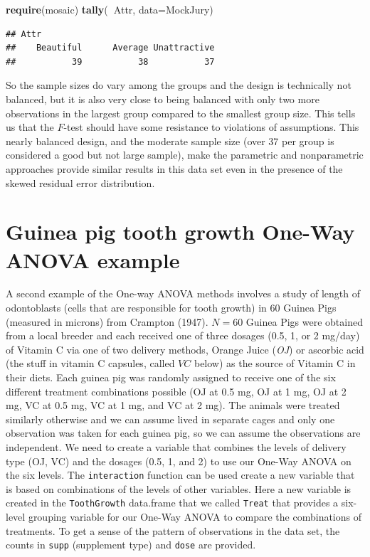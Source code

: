 \documentclass[]{book}
\newenvironment{Shaded}{\begin{snugshade}}{\end{snugshade}}
\newcommand{\KeywordTok}[1]{\textcolor[rgb]{0.13,0.29,0.53}{\textbf{#1}}}
\newcommand{\DataTypeTok}[1]{\textcolor[rgb]{0.13,0.29,0.53}{#1}}
\newcommand{\OperatorTok}[1]{\textcolor[rgb]{0.81,0.36,0.00}{\textbf{#1}}}
\newcommand{\NormalTok}[1]{#1}
\begin{document}
\begin{Shaded}
\begin{Highlighting}[]
\KeywordTok{require}\NormalTok{(mosaic)}
\KeywordTok{tally}\NormalTok{(}\OperatorTok{~}\NormalTok{Attr, }\DataTypeTok{data=}\NormalTok{MockJury)}
\end{Highlighting}
\end{Shaded}

\begin{verbatim}
## Attr
##    Beautiful      Average Unattractive 
##           39           38           37
\end{verbatim}

So the sample sizes do vary among the groups and the design is
technically not balanced, but it is also very close to being balanced
with only two more observations in the largest group compared to the
smallest group size. This tells us that the \(F\)-test should have some
resistance to violations of assumptions. This nearly balanced design,
and the moderate sample size (over 37 per group is considered a good but
not large sample), make the parametric and nonparametric approaches
provide similar results in this data set even in the presence of the
skewed residual error distribution.

\section{Guinea pig tooth growth One-Way ANOVA
example}\label{section3-5}

A second example of the One-way ANOVA methods involves a study of length
of odontoblasts (cells that are responsible for tooth growth) in 60
Guinea Pigs (measured in microns) from Crampton (1947). \(N=60\) Guinea
Pigs were obtained from a local breeder and each received one of three
dosages (0.5, 1, or 2 mg/day) of Vitamin C via one of two delivery
methods, Orange Juice (\emph{OJ}) or ascorbic acid (the stuff in vitamin
C capsules, called \(VC\) below) as the source of Vitamin C in their
diets. Each guinea pig was randomly assigned to receive one of the six
different treatment combinations possible (OJ at 0.5 mg, OJ at 1 mg, OJ
at 2 mg, VC at 0.5 mg, VC at 1 mg, and VC at 2 mg). The animals were
treated similarly otherwise and we can assume lived in separate cages
and only one observation was taken for each guinea pig, so we can assume
the observations are independent. We need to create a variable that
combines the levels of delivery type (OJ, VC) and the dosages (0.5, 1,
and 2) to use our One-Way ANOVA on the six levels. The
\texttt{interaction} function can be used create a new variable that is
based on combinations of the levels of other variables. Here a new
variable is created in the \texttt{ToothGrowth} data.frame that we
called \texttt{Treat} that provides a six-level grouping variable for
our One-Way ANOVA to compare the combinations of treatments. To get a
sense of the pattern of observations in the data set, the counts in
\texttt{supp} (supplement type) and \texttt{dose} are provided.
\end{document}
